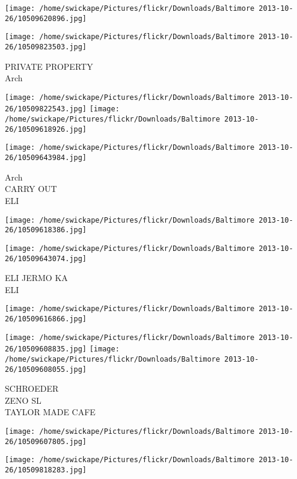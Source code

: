 \documentclass[10pt,letterpaper]{article}
\begin{document}
\texttt{[image: /home/swickape/Pictures/flickr/Downloads/Baltimore 2013-10-26/10509620896.jpg]}

\vspace{0.25in}
\texttt{[image: /home/swickape/Pictures/flickr/Downloads/Baltimore 2013-10-26/10509823503.jpg]}

PRIVATE PROPERTY\\
Arch\\
\pagebreak

\texttt{[image: /home/swickape/Pictures/flickr/Downloads/Baltimore 2013-10-26/10509822543.jpg]}
\texttt{[image: /home/swickape/Pictures/flickr/Downloads/Baltimore 2013-10-26/10509618926.jpg]}

\texttt{[image: /home/swickape/Pictures/flickr/Downloads/Baltimore 2013-10-26/10509643984.jpg]}

Arch\\
CARRY OUT\\
ELI\\
\pagebreak

\texttt{[image: /home/swickape/Pictures/flickr/Downloads/Baltimore 2013-10-26/10509618386.jpg]}

\vspace{0.25in}
\texttt{[image: /home/swickape/Pictures/flickr/Downloads/Baltimore 2013-10-26/10509643074.jpg]}

ELI JERMO KA\\
ELI\\
\pagebreak

\texttt{[image: /home/swickape/Pictures/flickr/Downloads/Baltimore 2013-10-26/10509616866.jpg]}

\vspace{0.25in}
\texttt{[image: /home/swickape/Pictures/flickr/Downloads/Baltimore 2013-10-26/10509608835.jpg]}
\texttt{[image: /home/swickape/Pictures/flickr/Downloads/Baltimore 2013-10-26/10509608055.jpg]}

SCHROEDER\\
ZENO SL\\
TAYLOR MADE CAFE\\
\pagebreak

\texttt{[image: /home/swickape/Pictures/flickr/Downloads/Baltimore 2013-10-26/10509607805.jpg]}

\vspace{0.25in}
\texttt{[image: /home/swickape/Pictures/flickr/Downloads/Baltimore 2013-10-26/10509818283.jpg]}
\end{document}
